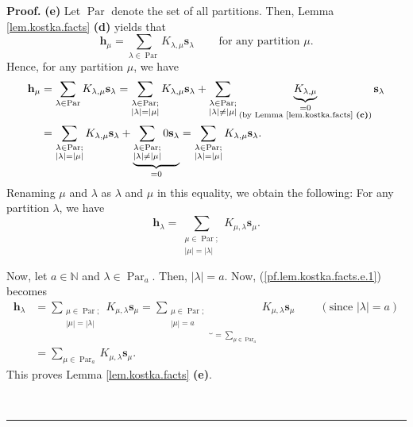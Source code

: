 \documentclass[numbers=enddot,12pt,final,onecolumn,notitlepage]{scrartcl}%
\theoremstyle{definition}
\newenvironment{proof}[1][Proof]{\noindent\textbf{#1.} }{\ \rule{0.5em}{0.5em}}
\let\sumnonlimits\sum
\renewcommand{\sum}{\sumnonlimits\limits}
\begin{document}
\begin{proof}
\textbf{(e)} Let $\operatorname*{Par}$ denote the set of all partitions. Then,
Lemma \ref{lem.kostka.facts} \textbf{(d)} yields that%
\[
\mathbf{h}_{\mu}=\sum_{\lambda\in\operatorname*{Par}}K_{\lambda,\mu}%
\mathbf{s}_{\lambda}\ \ \ \ \ \ \ \ \ \ \text{for any partition }\mu.
\]
Hence, for any partition $\mu$, we have%
\begin{align*}
\mathbf{h}_{\mu}  &  =\sum_{\lambda\in\operatorname*{Par}}K_{\lambda,\mu
}\mathbf{s}_{\lambda}=\sum_{\substack{\lambda\in\operatorname*{Par}%
;\\\left\vert \lambda\right\vert =\left\vert \mu\right\vert }}K_{\lambda,\mu
}\mathbf{s}_{\lambda}+\sum_{\substack{\lambda\in\operatorname*{Par}%
;\\\left\vert \lambda\right\vert \neq\left\vert \mu\right\vert }%
}\underbrace{K_{\lambda,\mu}}_{\substack{=0\\\text{(by Lemma
\ref{lem.kostka.facts} \textbf{(c)})}}}\mathbf{s}_{\lambda}\\
&  =\sum_{\substack{\lambda\in\operatorname*{Par};\\\left\vert \lambda
\right\vert =\left\vert \mu\right\vert }}K_{\lambda,\mu}\mathbf{s}_{\lambda
}+\underbrace{\sum_{\substack{\lambda\in\operatorname*{Par};\\\left\vert
\lambda\right\vert \neq\left\vert \mu\right\vert }}0\mathbf{s}_{\lambda}}%
_{=0}=\sum_{\substack{\lambda\in\operatorname*{Par};\\\left\vert
\lambda\right\vert =\left\vert \mu\right\vert }}K_{\lambda,\mu}\mathbf{s}%
_{\lambda}.
\end{align*}
Renaming $\mu$ and $\lambda$ as $\lambda$ and $\mu$ in this equality, we
obtain the following: For any partition $\lambda$, we have%
\begin{equation}
\mathbf{h}_{\lambda}=\sum_{\substack{\mu\in\operatorname*{Par};\\\left\vert
\mu\right\vert =\left\vert \lambda\right\vert }}K_{\mu,\lambda}\mathbf{s}%
_{\mu}. \label{pf.lem.kostka.facts.e.1}%
\end{equation}


Now, let $a\in\mathbb{N}$ and $\lambda\in\operatorname*{Par}\nolimits_{a}$.
Then, $\left\vert \lambda\right\vert =a$. Now, (\ref{pf.lem.kostka.facts.e.1})
becomes%
\begin{align*}
\mathbf{h}_{\lambda}  &  =\sum_{\substack{\mu\in\operatorname*{Par}%
;\\\left\vert \mu\right\vert =\left\vert \lambda\right\vert }}K_{\mu,\lambda
}\mathbf{s}_{\mu}=\underbrace{\sum_{\substack{\mu\in\operatorname*{Par}%
;\\\left\vert \mu\right\vert =a}}}_{=\sum_{\mu\in\operatorname*{Par}%
\nolimits_{a}}}K_{\mu,\lambda}\mathbf{s}_{\mu}\ \ \ \ \ \ \ \ \ \ \left(
\text{since }\left\vert \lambda\right\vert =a\right) \\
&  =\sum_{\mu\in\operatorname*{Par}\nolimits_{a}}K_{\mu,\lambda}%
\mathbf{s}_{\mu}.
\end{align*}
This proves Lemma \ref{lem.kostka.facts} \textbf{(e)}.


\end{proof}
\end{document}
